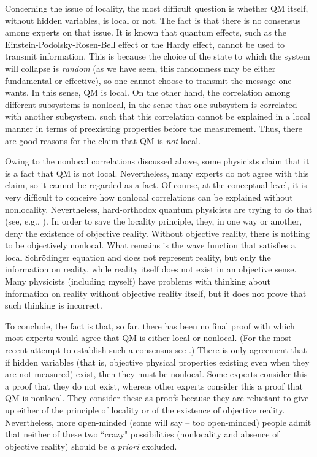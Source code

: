 \documentclass[12pt]{article}
\begin{document}
Concerning the issue of locality, the most difficult question is 
whether QM itself, without hidden variables, is local or not.
The fact is that there is no consensus among experts on that issue.
It is known that quantum effects, such as the Einstein-Podolsky-Rosen-Bell
effect or the Hardy effect, cannot be used to transmit information. 
This is because the choice of the state to which the system 
will collapse is {\em random} (as we have seen, this randomness may
be either fundamental or effective), so one cannot choose to 
transmit the message one wants. In this sense, QM is local.
On the other hand, 
the correlation among different subsystems is nonlocal, in the sense that
one subsystem is correlated with another subsystem, such that this correlation 
cannot be explained in a local manner in terms of preexisting properties
before the measurement.
Thus, there are good reasons for the claim that QM is {\em not} local.

Owing to the nonlocal correlations discussed above, some physicists 
claim that it is a fact that QM is not local. Nevertheless, 
many experts do not agree with this claim, 
so it cannot be regarded as a fact.
Of course, at the conceptual level, it is very difficult 
to conceive how nonlocal correlations can be explained without nonlocality.
Nevertheless, hard-orthodox quantum physicists are trying to do that
(see, e.g., \cite{zeil,rov1,rov2,mermcor}).
In order to save the locality principle, they, 
in one way or another, deny the existence 
of objective reality. Without objective reality, 
there is nothing to be objectively nonlocal.
What remains is the wave function that satisfies a local 
Schr\"odinger equation and does not represent reality, but only 
the information on reality, while reality itself
does not exist in an objective sense. 
Many physicists (including myself) have problems with thinking 
about information on reality without objective reality itself,
but it does not prove that such thinking is incorrect. 

To conclude, the fact is that, so far, there has been no final proof 
with which most experts would agree that QM is either local or 
nonlocal. (For the most recent attempt to establish such a 
consensus see \cite{niknonloc}.) 
There is only agreement that if hidden variables 
(that is, objective physical properties existing even when 
they are not measured) exist, then they must be nonlocal.
Some experts consider this a proof that they do not exist, whereas  
other experts consider this a proof that QM is nonlocal.
They consider these as proofs
because they are reluctant to give up either 
of the principle of locality or of the existence of objective reality. 
Nevertheless, more open-minded (some will say -- too open-minded) 
people admit that neither of these two ``crazy" possibilities 
(nonlocality and absence of objective reality) should be 
{\em a priori} excluded.  
 
\end{document}
